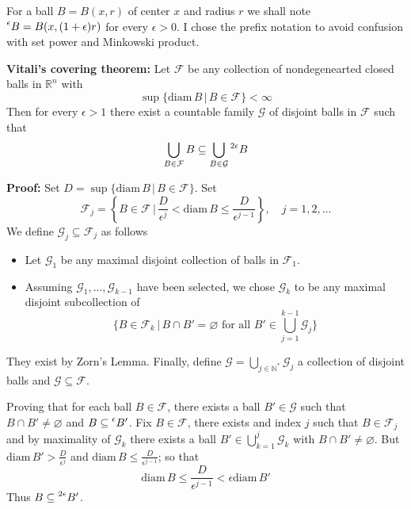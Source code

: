 \documentclass{article}
\begin{document}
\vspace{2ex}
For a ball $B=B(x, r)$ of center $x$ and radius $r$ we shall note $\prescript{\epsilon}{}B
=B(x, (1+\epsilon)r)$ for every $\epsilon>0$. I chose the prefix notation to
avoid confusion with set power and Minkowski product.

\vspace{1ex}
\textbf{Vitali's covering theorem:}
Let $\mathcal{F}$ be any collection of nondegenearted closed balls in
$\mathbb{R}^n$ with
\[ \sup\{\text{diam}\,B\,|\, B\in\mathcal{F}\}<\infty \]
Then for every $\epsilon>1$ there exist a countable family $\mathcal{G}$ of
disjoint balls in $\mathcal{F}$ such that
\[\bigcup_{B\in\mathcal{F}}B\subseteq\bigcup_{B\in\mathcal{G}}\prescript{2\epsilon}{}B\]

\vspace{1ex}
\textbf{Proof:}
Set $D=\sup\{\text{diam}\,B\,|\,B\in \mathcal{F}\}$. Set
\[\mathcal{F}_j=\left\{B\in\mathcal{F}\,|\,\frac{D}{\epsilon^j}<\text{diam}\,B\leq\frac{D}{\epsilon^{j-1}}\right\},\quad j=1,2,\ldots\]
We define $\mathcal{G}_j\subseteq\mathcal{F}_j$ as follows
\begin{itemize}
    \item Let $\mathcal{G}_1$ be any maximal disjoint collection of balls in
        $\mathcal{F}_1$.

    \item Assuming $\mathcal{G}_1,\ldots,\mathcal{G}_{k-1}$ have been selected,
        we chose $\mathcal{G}_k$ to be any maximal disjoint subcollection of
        \[ \{B\in\mathcal{F}_k\,|\,B\cap B'=\varnothing\text{ for all }B'\in\bigcup_{j=1}^{k-1}\mathcal{G}_j\}\]
\end{itemize}
They exist by Zorn's Lemma. Finally, define $\mathcal{G}=\bigcup_{j\in\mathbb{N}^*}\mathcal{G}_j$
a collection of disjoint balls and $\mathcal{G}\subseteq\mathcal{F}$.

\vspace{1ex}
Proving that for each ball $B\in\mathcal{F}$, there exists a ball $B'\in\mathcal{G}$
such that $B\cap B'\neq\varnothing$ and $B\subseteq\prescript{\epsilon}{}B'$. Fix
$B\in\mathcal{F}$, there exists and index $j$ such that $B\in\mathcal{F}_j$ and
by maximality of $\mathcal{G}_k$ there exists a ball $B'\in\bigcup_{k=1}^j
\mathcal{G}_k$ with $B\cap B'\neq\varnothing$. But $\text{diam}\,B'>\frac{D}{\epsilon^j}$
and $\text{diam}\,B\leq\frac{D}{\epsilon^{j-1}}$; so that
\[ \text{diam}\,B\leq \frac{D}{\epsilon^{j-1}} < \epsilon\text{diam}\,B'\]
Thus $B\subseteq\prescript{2\epsilon}{}B'$.
\end{document}
